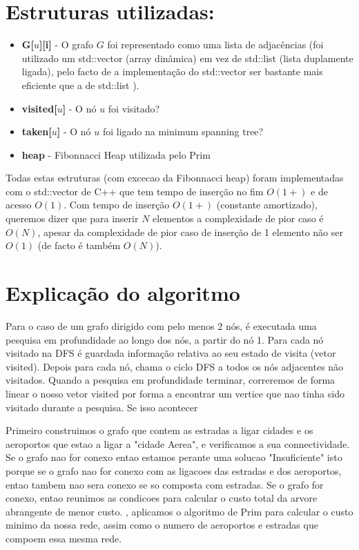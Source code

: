 \documentclass{scrartcl}
\begin{document}
\section*{Estruturas utilizadas:}
\begin{itemize}
\setlength\itemsep{-0.5ex}
\item \textbf{G[$u$][i]} - O grafo $G$ foi representado como uma lista de adjacências (foi utilizado um std::vector (array dinâmica) em vez de std::list (lista duplamente ligada), pelo facto de a implementação do std::vector ser bastante mais eficiente que a de std::list \cite{ISOC++:2003}).
\item \textbf{visited[$u$]} - O nó $u$ foi visitado?
\item \textbf{taken[$u$]} - O nó $u$ foi ligado na minimum spanning tree?
\item \textbf{heap} - Fibonnacci Heap utilizada pelo Prim
\end{itemize}
Todas estas estruturas (com excecao da Fibonnacci heap) foram implementadas com o std::vector de C++ que tem tempo de inserção no fim $O(1+)$ e de acesso $O(1)$. Com tempo de inserção $O(1+)$ (constante amortizado), queremos dizer que para inserir $N$ elementos a complexidade de pior caso é $O(N)$, apesar da complexidade de pior caso de inserção de 1 elemento não ser $O(1)$ (de facto é também $O(N)$). \cite{ISOC++:2003}

\section*{Explicação do algoritmo}
 Para o caso de um grafo dirigido com pelo menos 2 nós, é executada uma pesquisa em profundidade ao longo dos nós, a partir do nó 1. Para cada nó visitado na DFS é guardada informação relativa ao seu estado de visita (vetor visited). Depois para cada nó, chama o ciclo DFS a todos os nós adjacentes não visitados. Quando a pesquisa em profundidade terminar, correremos de forma linear o nosso vetor visited por forma a encontrar um vertice que nao tinha sido visitado durante a pesquisa. Se isso acontecer


Primeiro construimos o grafo que contem as estradas a ligar cidades e os aeroportos que estao a ligar a "cidade Aerea", e verificamos a sua connectividade. Se o grafo nao for conexo entao estamos perante uma solucao "Insuficiente" isto porque se o grafo nao for conexo com as ligacoes das estradas e dos aeroportos, entao tambem nao sera conexo se so composta com estradas. Se o grafo for conexo, entao reunimos as condicoes para calcular o custo total da arvore abrangente de menor custo. , aplicamos o algoritmo de Prim  para calcular o custo minimo da nossa rede, assim como o numero de aeroportos e estradas que compoem essa mesma rede.
\end{document}
